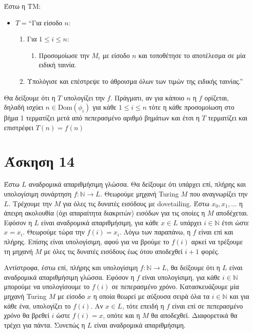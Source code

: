 \documentclass[a4paper, oneside, 11pt]{article}
\theoremstyle{definition}
\begin{document}
Έστω η ΤΜ:

\begin{itemize}
\item $T = $``Για είσοδο $n$:
      \begin{enumerate}
      \item Για $1 \leq i \leq n$:
            \begin{enumerate}
            \item Προσομοίωσε την $M_i$ με είσοδο $n$ και τοποθέτησε το αποτέλεσμα σε
                  μία ειδική ταινία.
            \end{enumerate}
      \item Υπολόγισε και επέστρεψε το άθροισμα όλων των τιμών της ειδικής ταινίας.''
      \end{enumerate}
\end{itemize}

Θα δείξουμε ότι η $T$ υπολογίζει την $f$. Πράγματι, αν για κάποιο $n$ η $f$ ορίζεται,
δηλαδή ισχύει
$n \in \text{Dom}(\phi_i)$ για κάθε $1 \leq i \leq n$ τότε η 
κάθε προσομοίωση στο βήμα 1 τερματίζει μετά από πεπερασμένο αριθμό βημάτων και έτσι η
$T$ τερματίζει και επιστρέφει $T(n) = f(n)$

\section*{Άσκηση 14}

Έστω $L$ αναδρομικά απαριθμήσιμη γλώσσα. Θα δείξουμε ότι υπάρχει επί, πλήρης και υπολογίσιμη
συνάρτηση $f:\mathbb{N}\rightarrow L$. Θεωρούμε μηχανή Turing $M$ που αναγνωρίζει την $L$.
Τρέχουμε την $M$ για όλες τις δυνατές εισόδους με dovetailing. Έστω $x_0, x_1, ... $ η άπειρη
ακολουθία (όχι απαραίτητα διακριτών) εισόδων για τις οποίες η $M$ αποδέχεται. Εφόσον η $L$ είναι
αναδρομικά απαριθμήσιμη, για κάθε $x\in L$ υπάρχει $i\in \mathbb{N}$ έτσι ώστε $x=x_i$.
Θεωρούμε τώρα την $f(i) = x_i$. Λόγω των παραπάνω, η $f$ είναι επί και πλήρης. Επίσης είναι
υπολογίσιμη, αφού για να βρούμε το $f(i)$ αρκεί να τρέξουμε τη μηχανή $M$ με όλες τις δυνατές
εισόδους έως ότου αποδεχθεί $i+1$ φορές. 

Αντίστροφα, έστω επί, πλήρης και υπολογίσιμη $f:\mathbb{N}\rightarrow L$, θα δείξουμε ότι η $L$
είναι αναδρομικά απαριθμήσιμη γλώσσα. Εφόσον η $f$ είναι υπολογίσιμη, για κάθε $i\in \mathbb{N}$
μπορούμε να υπολογίσουμε το $f(i)$ σε πεπερασμένο χρόνο. Κατασκευάζουμε μία μηχανή Turing $M$
με είσοδο $x$ η οποία θεωρεί με αύξουσα σειρά όλα τα $i\in \mathbb{N}$ και για κάθε ένα, 
υπολογίζει το $f(i)$. Αν $x\in L$, τότε επειδή η $f$ είναι επί σε πεπερασμένο χρόνο 
θα βρεθεί $i$ ώστε $f(i)=x$, οπότε και
η $M$ θα αποδεχθεί. Διαφορετικά θα τρέχει για πάντα. Συνεπώς η $L$ είναι αναδρομικά απαριθμήσιμη.
\end{document}
